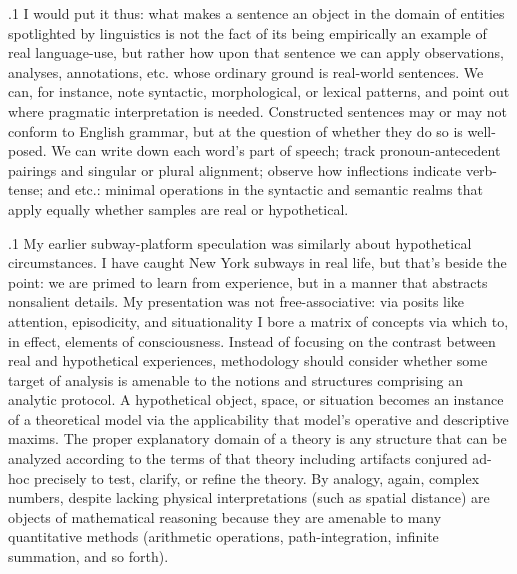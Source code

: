 \documentclass[11pt, twocolumn]{article}
\begin{document}
\p.1{%
I would put it thus: what makes a sentence an object in the
domain of entities spotlighted by linguistics is not the
fact of its being empirically an example of real language-use, but
rather how upon that sentence we can apply observations, analyses,
annotations, etc. whose ordinary ground is real-world
sentences.  We can, for instance, note syntactic, morphological, or lexical patterns,
and point out where pragmatic interpretation is needed.  Constructed
sentences may or may not conform to English grammar,
but at the question of whether they do so is well-posed.
We can write down each word's part of
speech; track pronoun-antecedent pairings and singular or plural alignment; observe
how inflections indicate verb-tense; and etc.: minimal operations in the
syntactic and semantic realms that apply equally
whether samples are real or hypothetical.
} %

\p.1{%
My earlier subway-platform speculation was similarly about hypothetical
circumstances.  I have caught New York subways in real life,
but that's beside the point: we are primed to learn from experience,
but in a manner that abstracts nonsalient details.
My presentation was not free-associative: via posits
like attention, episodicity, and situationality I bore a matrix of
concepts via which to, in effect,  elements of consciousness.
Instead of focusing on the contrast between real and hypothetical
experiences, methodology should consider whether some target of
analysis is amenable to the notions and structures comprising an
analytic protocol.  A hypothetical object, space, or situation becomes
an instance of a theoretical model via the applicability
that model's operative and descriptive maxims.  The proper explanatory
domain of a theory is any structure that can be analyzed
according to the terms of that theory \mdash{} including artifacts
conjured ad-hoc precisely to test, clarify, or refine the theory.
By analogy, again, complex numbers, despite
lacking physical interpretations (such as spatial distance)
are objects of mathematical reasoning because they are
amenable to many quantitative methods (arithmetic
operations, path-integration, infinite summation, and so forth).
} %
\end{document}
